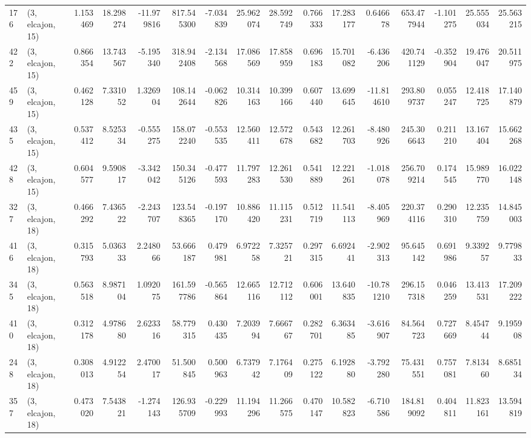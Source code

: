 \begin{tabular}{llrrrrrrrrrrrrrr}
176 &  (3, elcajon, 15) &   1.153469 &  18.298274 & -11.979816 &   817.545300 &  -7.034839 &  25.962074 &  28.592749 &  0.766333 &  17.283177 &   0.646678 &   653.477944 & -1.101275 &  25.555034 &  25.563215 \\
422 &  (3, elcajon, 15) &   0.866354 &  13.743567 &  -5.195340 &   318.942408 &  -2.134568 &  17.086569 &  17.858959 &  0.696183 &  15.701082 &  -6.436206 &   420.741129 & -0.352904 &  19.476047 &  20.511975 \\
459 &  (3, elcajon, 15) &   0.462128 &   7.331052 &   1.326904 &   108.142644 &  -0.062826 &  10.314163 &  10.399166 &  0.607440 &  13.699645 & -11.814610 &   293.809737 &  0.055247 &  12.418725 &  17.140879 \\
435 &  (3, elcajon, 15) &   0.537412 &   8.525334 &  -0.555275 &   158.072240 &  -0.553535 &  12.560411 &  12.572678 &  0.543682 &  12.261703 &  -8.480926 &   245.306643 &  0.211210 &  13.167404 &  15.662268 \\
428 &  (3, elcajon, 15) &   0.604577 &   9.590817 &  -3.342042 &   150.345126 &  -0.477593 &  11.797283 &  12.261530 &  0.541889 &  12.221261 &  -1.018078 &   256.709214 &  0.174545 &  15.989770 &  16.022148 \\
327 &  (3, elcajon, 18) &   0.466292 &   7.436522 &  -2.243707 &   123.548365 &  -0.197170 &  10.886420 &  11.115231 &  0.512719 &  11.541113 &  -8.405969 &   220.374116 &  0.290310 &  12.235759 &  14.845003 \\
416 &  (3, elcajon, 18) &   0.315793 &   5.036333 &   2.248066 &    53.666187 &   0.479981 &   6.972258 &   7.325721 &  0.297315 &   6.692441 &  -2.902313 &    95.645142 &  0.691986 &   9.339257 &   9.779833 \\
345 &  (3, elcajon, 18) &   0.563518 &   8.987104 &   1.092075 &   161.597786 &  -0.565864 &  12.665116 &  12.712112 &  0.606001 &  13.640835 & -10.781210 &   296.157318 &  0.046259 &  13.413531 &  17.209222 \\
410 &  (3, elcajon, 18) &   0.312178 &   4.978680 &   2.623316 &    58.779315 &   0.430435 &   7.203994 &   7.666767 &  0.282701 &   6.363485 &  -3.616907 &    84.564723 &  0.727669 &   8.454744 &   9.195908 \\
248 &  (3, elcajon, 18) &   0.308013 &   4.912254 &   2.470017 &    51.500845 &   0.500963 &   6.737942 &   7.176409 &  0.275122 &   6.192880 &  -3.792280 &    75.431551 &  0.757081 &   7.813460 &   8.685134 \\
357 &  (3, elcajon, 18) &   0.473020 &   7.543821 &  -1.274143 &   126.935709 &  -0.229993 &  11.194296 &  11.266575 &  0.470147 &  10.582823 &  -6.710586 &   184.819092 &  0.404811 &  11.823161 &  13.594819 \\

\end{tabular}

